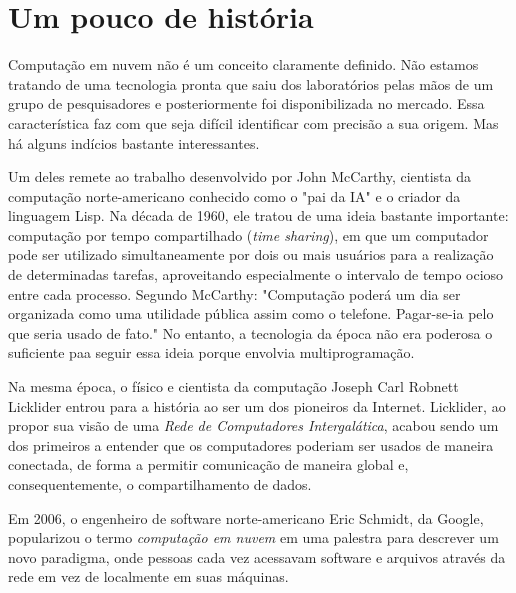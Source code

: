\section{Um pouco de história}

Computação em nuvem não é um conceito claramente definido. Não estamos tratando de
uma tecnologia pronta que saiu dos laboratórios pelas mãos de um grupo de
pesquisadores e posteriormente foi disponibilizada no mercado. Essa característica
faz com que seja difícil identificar com precisão a sua origem. Mas há alguns
indícios bastante interessantes.

Um deles remete ao trabalho desenvolvido por John McCarthy, cientista da computação
norte-americano conhecido como o "pai da IA" e o criador da linguagem Lisp. Na década de 1960,
ele tratou de uma ideia bastante importante: computação por tempo compartilhado (\emph{time sharing}),
em que um computador pode ser utilizado simultaneamente por dois ou mais usuários para a realização de
determinadas tarefas, aproveitando especialmente o intervalo de tempo ocioso entre cada processo.
Segundo McCarthy: "Computação poderá um dia ser organizada como uma utilidade pública assim como o
telefone. Pagar-se-ia pelo que seria usado de fato." No entanto, a tecnologia da época não era poderosa
o suficiente paa seguir essa ideia porque envolvia multiprogramação.

Na mesma época, o físico e cientista da computação Joseph Carl Robnett Licklider
entrou para a história ao ser um dos pioneiros da Internet. Licklider, ao propor sua visão
de uma \emph{Rede de Computadores Intergalática}, acabou sendo um dos primeiros a entender
que os computadores poderiam ser usados de maneira conectada, de forma a permitir comunicação
de maneira global e, consequentemente, o compartilhamento de dados.

Em 2006, o engenheiro de software norte-americano Eric Schmidt, da Google, popularizou o
termo \emph{computação em nuvem} em uma palestra para descrever um novo paradigma, onde
pessoas cada vez acessavam software e arquivos através da rede em vez de localmente em suas
máquinas.

